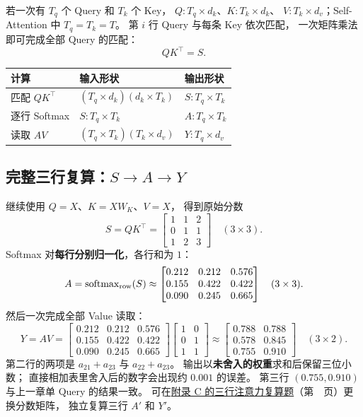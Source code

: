 若一次有 $T_q$ 个 Query 和 $T_k$ 个 Key，
$Q:T_q\times d_k$、$K:T_k\times d_k$、
$V:T_k\times d_v$；Self-Attention 中 $T_q=T_k=T$。
第 $i$ 行 Query 与每条 Key 依次匹配，
一次矩阵乘法即可完成全部 Query 的匹配：
\[
QK^\top=S.
\]
\begin{center}\small
{}
\begin{tabular}{@{}lll@{}}
\toprule
计算 & 输入形状 & 输出形状\\\midrule
匹配 $QK^\top$ & $(T_q\times d_k)(d_k\times T_k)$ & $S:T_q\times T_k$\\
逐行 Softmax & $S:T_q\times T_k$ & $A:T_q\times T_k$\\
读取 $AV$ & $(T_q\times T_k)(T_k\times d_v)$ & $Y:T_q\times d_v$\\
\bottomrule
\end{tabular}
\end{center}

\subsection{\texorpdfstring{完整三行复算：$S\to A\to Y$}{完整三行复算：S 到 A 到 Y}}
继续使用 $Q=X$、$K=XW_K$、$V=X$，
得到原始分数
\[
S=QK^\top=\begin{bmatrix}
1&1&2\\
0&1&1\\
1&2&3
\end{bmatrix}\quad(3\times3).
\]
Softmax 对\textbf{每行分别归一化}，各行和为 $1$：
\begin{equation}
\label{eq:three-query-attention-weights}
A=\operatorname{softmax}_{\rm row}(S)
\approx\boxed{\begin{bmatrix}
0.212&0.212&0.576\\
0.155&0.422&0.422\\
0.090&0.245&0.665
\end{bmatrix}}\quad(3\times3).
\end{equation}
然后一次完成全部 Value 读取：
\begin{equation}
\label{eq:three-query-attention-output}
Y=AV=
\begin{bmatrix}
0.212&0.212&0.576\\
0.155&0.422&0.422\\
0.090&0.245&0.665
\end{bmatrix}
\begin{bmatrix}1&0\\0&1\\1&1\end{bmatrix}
\approx\boxed{\begin{bmatrix}
0.788&0.788\\
0.578&0.845\\
0.755&0.910
\end{bmatrix}}\quad(3\times2).
\end{equation}
第二行的两项是 $a_{21}+a_{23}$ 与 $a_{22}+a_{23}$。
输出以\textbf{未舍入的权重}求和后保留三位小数；
直接相加表里舍入后的数字会出现约 $0.001$ 的误差。
第三行 $(0.755,0.910)$ 与上一章单 Query 的结果一致。
可在\hyperref[exercise:batch-softmax-recompute]{附录 C 的三行注意力复算题}（第~\pageref*{exercise:batch-softmax-recompute}~页）更换分数矩阵，
独立复算三行 $A'$ 和 $Y'$。


